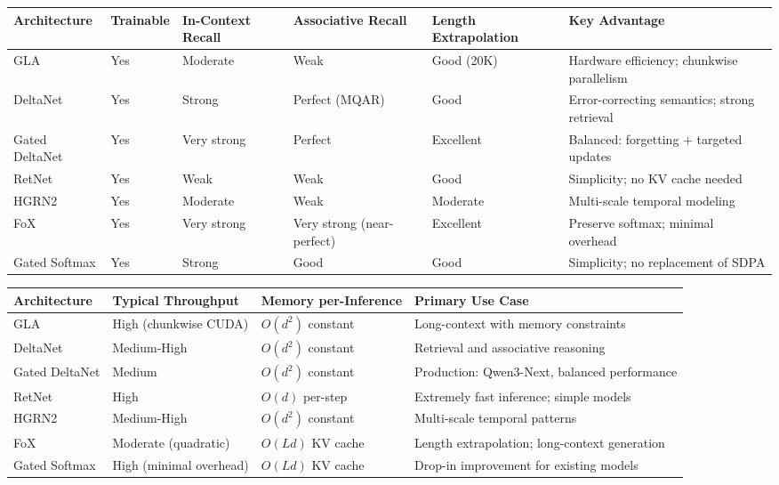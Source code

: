 \documentclass[11pt,a4paper]{article}
\begin{document}
\medskip

\footnotesize
\begin{longtable}{p{1.8cm}p{2.0cm}p{2.2cm}p{2.2cm}p{2.2cm}p{1.8cm}}
\toprule
\textbf{Architecture} & \textbf{Trainable} & \textbf{In-Context Recall} & \textbf{Associative Recall} & \textbf{Length Extrapolation} & \textbf{Key Advantage} \\
\midrule
\endhead
GLA & Yes & Moderate & Weak & Good (20K) & Hardware efficiency; chunkwise parallelism \\
DeltaNet & Yes & Strong & Perfect (MQAR) & Good & Error-correcting semantics; strong retrieval \\
Gated DeltaNet & Yes & Very strong & Perfect & Excellent & Balanced: forgetting + targeted updates \\
RetNet & Yes & Weak & Weak & Good & Simplicity; no KV cache needed \\
HGRN2 & Yes & Moderate & Weak & Moderate & Multi-scale temporal modeling \\
FoX & Yes & Very strong & Very strong (near-perfect) & Excellent & Preserve softmax; minimal overhead \\
Gated Softmax & Yes & Strong & Good & Good & Simplicity; no replacement of SDPA \\
\bottomrule
\end{longtable}
\normalsize

\medskip

\footnotesize
\begin{longtable}{p{2.0cm}p{2.4cm}p{2.8cm}p{3.4cm}}
\toprule
\textbf{Architecture} & \textbf{Typical Throughput} & \textbf{Memory per-Inference} & \textbf{Primary Use Case} \\
\midrule
\endhead
GLA & High (chunkwise CUDA) & $O(d^2)$ constant & Long-context with memory constraints \\
DeltaNet & Medium-High & $O(d^2)$ constant & Retrieval and associative reasoning \\
Gated DeltaNet & Medium & $O(d^2)$ constant & Production: Qwen3-Next, balanced performance \\
RetNet & High & $O(d)$ per-step & Extremely fast inference; simple models \\
HGRN2 & Medium-High & $O(d^2)$ constant & Multi-scale temporal patterns \\
FoX & Moderate (quadratic) & $O(Ld)$ KV cache & Length extrapolation; long-context generation \\
Gated Softmax & High (minimal overhead) & $O(Ld)$ KV cache & Drop-in improvement for existing models \\
\bottomrule
\end{longtable}
\normalsize
\end{document}
